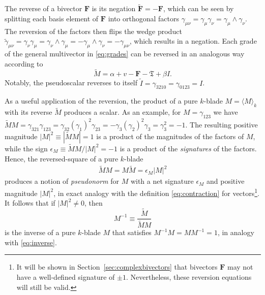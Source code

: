 \documentclass[1p,sort&compress]{elsarticle}
\numberwithin{equation}{section}
\newcommand{\bv}[1]{\mathbf{#1}}
\newcommand{\mean}[1]{\langle #1 \rangle}
\begin{document}
The reverse of a bivector $\bv{F}$ is its negation $\widetilde{\bv{F}} = -\bv{F}$, which can be seen by splitting each basis element of $\bv{F}$ into orthogonal factors $\gamma_{\mu\nu} = \gamma_{\mu} \gamma_{\nu} = \gamma_{\mu} \wedge \gamma_{\nu}$.  The reversion of the factors then flips the wedge product $\widetilde{\gamma}_{\mu\nu} = \gamma_\nu\gamma_\mu = \gamma_\nu\wedge \gamma_\mu = -\gamma_\mu\wedge \gamma_\nu = -\gamma_{\mu\nu}$, which results in a negation.  Each grade of the general multivector in \eqref{eq:grades} can be reversed in an analogous way according to
\begin{equation}\label{eq:reversegrades}
  \widetilde{M} = \alpha + v - \bv{F} - \mathfrak{T} + \beta I.
\end{equation}
Notably, the pseudoscalar reverses to itself $\widetilde{I} = \gamma_{3210} = \gamma_{0123} = I$.

As a useful application of the reversion, the product of a pure $k$-blade $M = \mean{M}_k$ with its reverse $\widetilde{M}$ produces a scalar.  As an example, for $M = \gamma_{123}$ we have $\widetilde{M} M = \gamma_{321}\gamma_{123} = \gamma_{32}(\gamma_1)^2\gamma_{23} = -\gamma_3(\gamma_2)^2\gamma_3 = \gamma_3^2 = -1$.  The resulting positive magnitude $|M|^2 \equiv |\widetilde{M}M| = 1$ is a product of the magnitudes of the factors of $M$, while the sign $\epsilon_M \equiv \widetilde{M}M/|M|^2 = -1$ is a product of the \emph{signatures} of the factors.  Hence, the reversed-square of a pure $k$-blade 
\begin{align}
  \widetilde{M} M = M \widetilde{M} = \epsilon_{M} |M|^2
\end{align}
produces a notion of \emph{pseudonorm} for $M$ with a net signature $\epsilon_{M}$ and positive magnitude $|M|^2$, in exact analogy with the definition \eqref{eq:contraction} for vectors\footnote{It will be shown in Section~\ref{sec:complexbivectors} that bivectors $\bv{F}$ may not have a well-defined signature of $\pm 1$.  Nevertheless, these reversion equations will still be valid.}.  It follows that if $|M|^2 \neq 0$, then
\begin{equation}\label{eq:bladeinverse}
  M^{-1} \equiv \frac{\widetilde{M}}{\widetilde{M} M}
\end{equation}
is the inverse of a pure $k$-blade $M$ that satisfies $M^{-1}M = M M^{-1} = 1$, in analogy with \eqref{eq:inverse}.  

\end{document}
